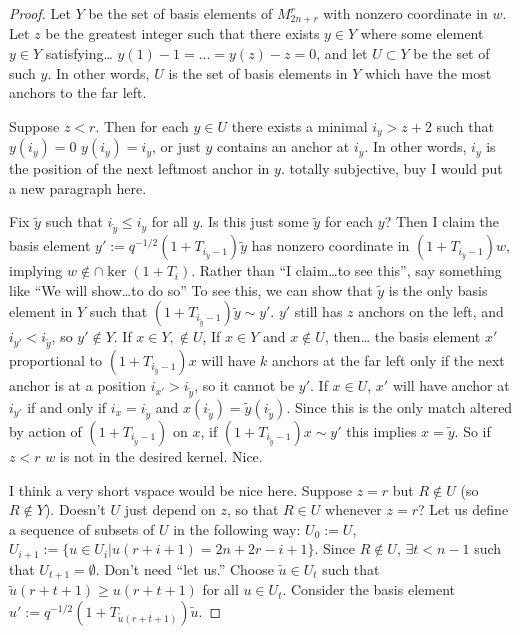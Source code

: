 \documentclass{amsart}
\begin{document}
\begin{proof}
  Let $Y$ be the set of basis elements 
  {\color{magenta} of $M_{2n + r}^r$} 
  with nonzero coordinate in $w$. 
  Let $z$ be the greatest integer such that there exists $y\in Y$ where 
  {\color{magenta} some element $y \in Y$ satisfying\ldots} 
  $y(1)-1=...=y(z)-z=0$, and let $U\subset Y$ be the set of such $y$. 
  In other words, $U$ is the set of basis elements in $Y$ which have the most anchors to the far left.
	
	Suppose $z<r$. 
  Then for each $y\in U$ there exists a minimal $i_y>z+2$ such that $y(i_y) =0$ 
  {\color{magenta} $y(i_y) = i_y$, or just $y$ contains an anchor at $i_y$}. 
  In other words, $i_y$ is the position of the next leftmost anchor in $y$.
  {\color{magenta} totally subjective, buy I would put a new paragraph here.} 
  
  Fix $\tilde{y}$ such that $i_{\tilde{y}}\leq i_y$ for all $y$. 
  {\color{magenta} Is this just some $\tilde y$ for each $y$?}
  Then I claim the basis element $y':=q^{-1/2}(1+T_{i_{\tilde{y}}-1})\tilde{y}$ has nonzero coordinate in $(1+T_{i_{\tilde{y}}-1})w$, implying $w\not\in \cap\ker(1+T_i)$.
  {\color{magenta} Rather than ``I claim\ldots to see this'', say something like ``We will show\ldots to do so''}
  To see this, we can show that $\tilde{y}$ is the only basis element in $Y$ such that $(1+T_{i_{\tilde{y}}-1})\tilde{y}\sim y'$. $y'$ still has $z$ anchors on the left, and $i_{y'}<i_{\tilde{y}}$, so $y'\not\in Y$.
  If $x\in Y,\not\in U$,
  {\color{magenta} If $x \in Y$ and $x \not\in U$, then\ldots}
  the basis element $x'$ proportional to $(1+T_{i_{\tilde{y}}-1})x$ will have $k$ anchors at the far left only if the next anchor is at a position $i_{x'}>i_{\tilde{y}}$, so it cannot be $y'$. If $x\in U$, $x'$ will have anchor at $i_{y'}$ if and only if $i_x=i_{\tilde{y}}$ and $x(i_{\tilde{y}})=\tilde{y}(i_{\tilde{y}})$. Since this is the only match altered by action of $(1+T_{i_{\tilde{y}}-1})$ on $x$, if $(1+T_{i_{\tilde{y}}-1})x\sim y'$ this implies $x=\tilde{y}$. So if $z<r$ $w$ is not in the desired kernel.
  {\color{magenta} Nice.}

  {\color{magenta} I think a very short vspace would be nice here.}
	Suppose $z=r$ but $R\not\in U$ (so $R\not\in Y$).
  {\color{magenta} Doesn't $U$ just depend on $z$, so that $R \in U$ whenever $z=r$?}
  Let us define a sequence of subsets of $U$ in the following way: $U_0:=U$, $U_{i+1}:=\{u\in U_i| u(r+i+1)=2n+2r-i+1 \}$. Since $R\not\in U$, $\exists t<n-1$ such that $U_{t+1}=\emptyset$. 
  {\color{magenta} Don't need ``let us.''}
  Choose $\tilde{u}\in U_t$ such that $\tilde{u}(r+t+1)\geq u(r+t+1)$ for all $u\in U_t$. Consider the basis element $u':=q^{-1/2}(1+T_{\tilde{u}(r+t+1)})\tilde{u}$. 
  

\end{proof}
\end{document}
